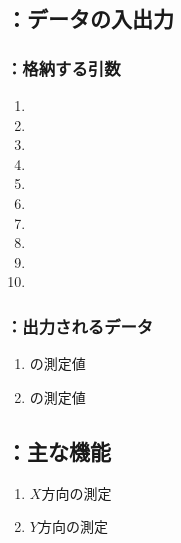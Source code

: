 \subsection{\MCenterline：データの入出力}

\subsubsection{\MCenterline：格納する引数}
\begin{enumerate}[label*=\sarrow]
\item \PMCenterlineEndFaceDifAC
\item \PMAlocationAngle
\item \PMTopOutcutACWidth
\item \PMTopOutcutBDWidth
\item \PMBottomOutcutACWidth
\item \PMBottomOutcutBDWidth
\item \PMTopReAlocationLength
\item \PMBottomReAlocationLength
\item \PMKeywayPos
\item \PMBottomOutcutLength
\end{enumerate}

\subsubsection{\MCenterline：出力されるデータ}
\begin{enumerate}[label*=\sarrow]
\item \CenterlineEndFaceDifAC の測定値
\item \CenterlineEndFaceDifBD の測定値
\end{enumerate}


\subsection{\MCenterline：主な機能}
\begin{enumerate}[label*=\sarrow]
\item $X$方向\CenterlineEndFaceDif の測定
\item $Y$方向\CenterlineEndFaceDif の測定
\end{enumerate}


